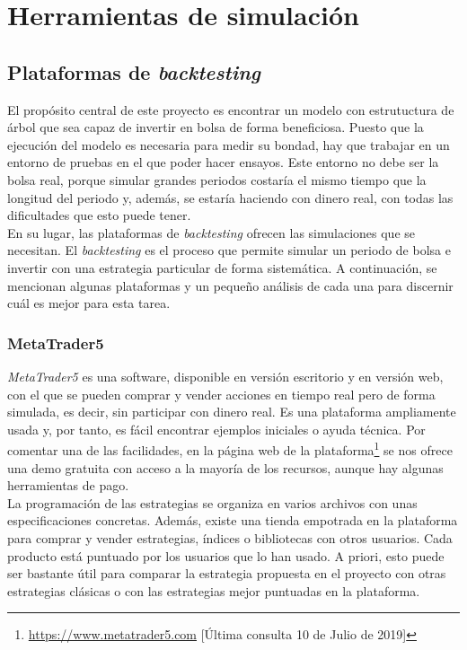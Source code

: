 
	\section{Herramientas de simulaci\'on}
	\subsection{Plataformas de \textit{backtesting}}		
	El prop\'osito central de este proyecto es encontrar un modelo con estrutuctura de \'arbol que sea capaz de invertir en bolsa de forma beneficiosa. Puesto que la ejecuci\'on del modelo es necesaria para medir su bondad, hay que trabajar en un entorno de pruebas en el que poder hacer ensayos. Este entorno no debe ser la bolsa real, porque simular grandes periodos costar\'ia el mismo tiempo que la longitud del periodo y, adem\'as, se estar\'ia haciendo con dinero real, con todas las dificultades que esto puede tener.\\
	
	En su lugar, las plataformas de \textit{backtesting} ofrecen las simulaciones que se necesitan. El \textit{backtesting} es el proceso que permite simular un periodo de bolsa e invertir con una estrategia particular de forma sistem\'atica. A continuaci\'on, se mencionan algunas plataformas y un peque\~no an\'alisis de cada una para discernir cu\'al es mejor para esta tarea.\\ 
	
	
		\subsubsection{MetaTrader5}
		
    	\textit{MetaTrader5} es una software, disponible en versi\'on escritorio y en versi\'on web, con el que se pueden comprar y vender acciones en tiempo real pero de forma simulada, es decir, sin participar con dinero real. Es una plataforma ampliamente usada y, por tanto, es f\'acil encontrar ejemplos iniciales o ayuda t\'ecnica. Por comentar una de las facilidades, en la p\'agina web de la plataforma\footnote{\url{https://www.metatrader5.com} [\'Ultima consulta 10 de Julio de 2019]} se nos ofrece una demo gratuita con acceso a la mayor\'ia de los recursos, aunque hay algunas herramientas de pago.\\
		
		La programaci\'on de las estrategias se organiza en varios archivos con unas especificaciones concretas. Adem\'as, existe una tienda empotrada en la plataforma para comprar y vender estrategias, \'indices o bibliotecas con otros usuarios. Cada producto est\'a puntuado por los usuarios que lo han usado. A priori, esto puede ser bastante \'util para comparar la estrategia propuesta en el proyecto con otras estrategias cl\'asicas o con las estrategias mejor puntuadas en la plataforma.\\
		
